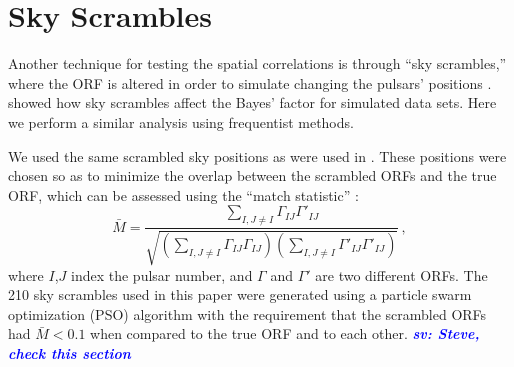 \documentclass[twocolumn,aps,prd,superscriptaddress]{revtex4-1}
\newcommand{\sv}[1]{\textcolor{blue}{\it{\textbf{sv: #1}}} }
\begin{document}
\section{Sky Scrambles}
\label{sec:skyscrambles}

Another technique for testing the spatial correlations is through ``sky scrambles,'' 
where the ORF is altered in order to simulate changing the pulsars' positions \citep{cs2016}. 
\citet{tlb+2017} showed how sky scrambles affect the Bayes' factor for simulated data sets. 
Here we perform a similar analysis using frequentist methods.

We used the same scrambled sky positions as were used in \citet{tlb+2017}. 
These positions were chosen so as to minimize the overlap  
between the scrambled ORFs and the true ORF, 
which can be assessed using the ``match statistic'' \citep{cs2016}:
\begin{equation}
	\bar{M} = \frac{\sum_{I,J \neq I} \Gamma_{IJ} \Gamma'_{IJ}}{\sqrt{ \left( \sum_{I, J \neq I} \Gamma_{IJ} \Gamma_{IJ} \right) \left( \sum_{I, J \neq I} \Gamma'_{IJ} \Gamma'_{IJ} \right)}} \,,
\end{equation}
where $I$,$J$ index the pulsar number, and $\Gamma$ and $\Gamma'$ are two different ORFs. 
The 210 sky scrambles used in this paper were generated 
using a particle swarm optimization (PSO) algorithm \citep{ke1995,se1998} 
with the requirement that the scrambled ORFs had $\bar{M} < 0.1$ when compared to the true ORF and to each other.
\sv{Steve, check this section}
\end{document}
